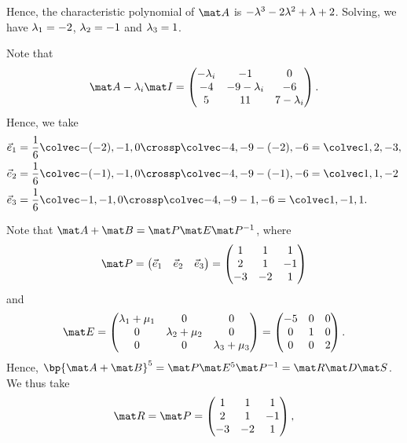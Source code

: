 \begin{solution}
\begin{ppart}
\begin{psubpart}
            Hence, the characteristic polynomial of $\mat A$ is $-\lambda^3 - 2 \lambda^2 + \lambda + 2$. Solving, we have $\lambda_1 = -2$, $\lambda_2 = -1$ and $\lambda_3 = 1$.

            Note that \[\mat A - \l_i \mat I = \begin{pmatrix}-\l_i & -1 & 0 \\ -4 & -9 - \l_i & -6 \\ 5 & 11 & 7 - \l_i\end{pmatrix}.\] Hence, we take
            \begin{align*}
                \vec e_1 &= \frac16 \cveciii{- (-2)}{-1}{0} \crossp \cveciii{-4}{-9 - (-2)}{-6} = \cveciii12{-3},\\
                \vec e_2 &= \frac16 \cveciii{- (-1)}{-1}{0} \crossp \cveciii{-4}{-9 - (-1)}{-6} = \cveciii11{-2}\\
                \vec e_3 &= \frac16 \cveciii{-1}{-1}0 \crossp \cveciii{-4}{-9 - 1}{-6} = \cveciii1{-1}1.
            \end{align*}
        \end{psubpart}
        \begin{psubpart}
            Note that $\mat A + \mat B = \mat P \mat E \mat P^{-1}$, where \[\mat P = \begin{pmatrix}\vec e_1 & \vec e_2 & \vec e_3 \end{pmatrix} = \begin{pmatrix}1 & 1 & 1 \\ 2 & 1 & -1 \\ -3 & -2 & 1\end{pmatrix}\] and \[\mat E = \begin{pmatrix}\l_1 + \m_1 & 0 & 0 \\ 0 & \l_2 + \m_2 & 0 \\ 0 & 0 & \l_3 + \m_3\end{pmatrix} = \begin{pmatrix}-5 & 0 & 0 \\ 0 & 1 & 0 \\ 0 & 0 & 2\end{pmatrix}.\] Hence, $\bp{\mat A + \mat B}^5 = \mat P \mat E^5 \mat P^{-1} = \mat R \mat D \mat S$. We thus take
            \begin{align*}
                \mat R &= \mat P = \begin{pmatrix}1 & 1 & 1 \\ 2 & 1 & -1 \\ -3 & -2 & 1\end{pmatrix},\\

\end{align*}
\end{psubpart}
\end{ppart}
\end{solution}
